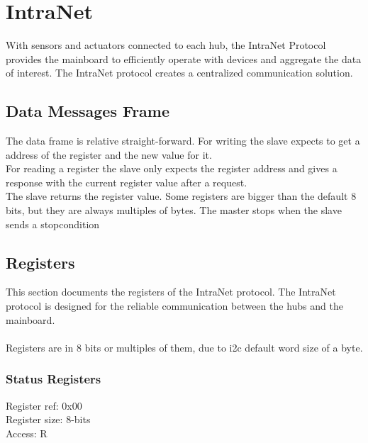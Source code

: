 \chapter{IntraNet}
With sensors and actuators connected to each hub, the IntraNet Protocol provides the mainboard to efficiently operate with devices and aggregate the data of interest. The IntraNet protocol creates a centralized communication solution.

\section{Data Messages Frame}
The data frame is relative straight-forward. For writing the slave expects to get a address of the register and the new value for it. \\
For reading a register the slave only expects the register address and gives a response with the current register value after a request. \\
The slave returns the register value. Some registers are bigger than the default 8 bits, but they are always multiples of bytes. 
The master stops when the slave sends a stopcondition 

\section{Registers}
This section documents the registers of the IntraNet protocol. The IntraNet protocol is designed for the reliable communication between the hubs and the mainboard. \\\\
Registers are in 8 bits or multiples of them, due to i2c default word size of a byte.

\subsection{Status Registers}
Register ref: 0x00\\
Register size: 8-bits\\
Access: R\\

